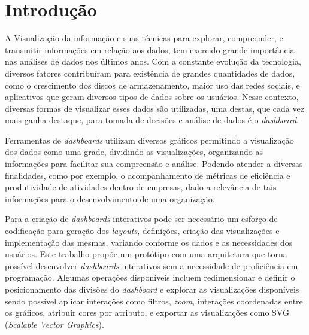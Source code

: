 \documentclass[
	12pt,				%
	openright,			%
	oneside,			%
	a4paper,			%
	english,			%
	brazil				%
	]{abntex2}
\begin{document}

\tableofcontents*
\cleardoublepage



\textual


\chapter{Introdução}
\label{ch:introduca}

A Visualização da informação e suas técnicas para explorar, compreender, e transmitir informações em relação aos dados, tem exercido grande importância nas análises de dados nos últimos anos. Com a constante evolução da tecnologia, diversos fatores contribuíram para existência de grandes quantidades de dados, como o crescimento dos discos de armazenamento, maior uso das redes sociais, e aplicativos que geram diversos tipos de dados sobre os usuários. Nesse contexto, diversas formas de visualizar esses dados são utilizadas, uma destas, que cada vez mais ganha destaque, para tomada de decisões e análise de dados é o \textit{dashboard}.

Ferramentas de \textit{dashboards} utilizam diversos gráficos permitindo a visualização dos dados como uma grade, dividindo as visualizações, organizando as informações para facilitar sua compreensão e análise. Podendo atender a diversas finalidades, como por exemplo, o acompanhamento de métricas de eficiência e produtividade de atividades dentro de empresas, dado a relevância de tais informações para o desenvolvimento de uma organização.

Para a criação de \textit{dashboards} interativos pode ser necessário um esforço de codificação para geração dos \textit{layouts}, definições, criação das visualizações e implementação das mesmas, variando conforme os dados e as necessidades dos usuários. Este trabalho propõe um protótipo com uma arquitetura que torna possível desenvolver \textit{dashboards} interativos sem a necessidade de proficiência em programação. Algumas operações disponíveis incluem redimensionar e definir o posicionamento das divisões do \textit{dashboard} e explorar as visualizações disponíveis sendo possível aplicar interações como filtros, \textit{zoom}, interações coordenadas entre os gráficos, atribuir cores por atributo, e exportar as visualizações como SVG (\textit{Scalable Vector Graphics}).
\end{document}

